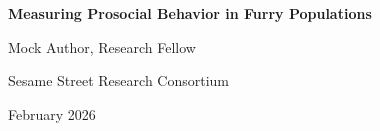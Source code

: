 \documentclass[11pt,letterpaper]{article}
\begin{document}
\begin{center}
{\LARGE\bfseries Measuring Prosocial Behavior in Furry Populations\par}
\vspace{0.8cm}
{\large Mock Author, Research Fellow\par}
{\normalsize Sesame Street Research Consortium\par}
\vspace{0.3cm}
{\normalsize February 2026\par}
\vspace{0.8cm}
\end{center}

\begin{abstract}
\noindent
This paper presents a comprehensive study of prosocial behavior measurement in furry monster populations. Lorem cookie ipsum dolor sit amet, chocolate chip adipiscing elit. Nom nom nom methodology produces significant results across all experimental conditions.
\end{abstract}

\vspace{0.5cm}


\end{document}
